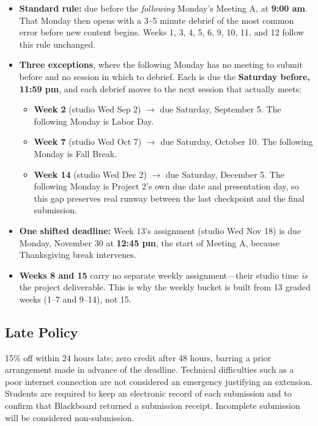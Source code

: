 \documentclass[11pt]{article}
\begin{document}
\begin{itemize}
  \item \textbf{Standard rule:} due before the \emph{following} Monday's Meeting A, at
        \textbf{9:00 am}. That Monday then opens with a 3--5 minute debrief of the most common
        error before new content begins. Weeks 1, 3, 4, 5, 6, 9, 10, 11, and 12 follow this
        rule unchanged.
  \item \textbf{Three exceptions}, where the following Monday has no meeting to submit before
        and no session in which to debrief. Each is due the \textbf{Saturday before, 11:59
        pm}, and each debrief moves to the next session that actually meets:
        \begin{itemize}
          \item \textbf{Week 2} (studio Wed Sep 2) $\rightarrow$ due Saturday, September 5.
                The following Monday is Labor Day.
          \item \textbf{Week 7} (studio Wed Oct 7) $\rightarrow$ due Saturday, October 10.
                The following Monday is Fall Break.
          \item \textbf{Week 14} (studio Wed Dec 2) $\rightarrow$ due Saturday, December 5.
                The following Monday is Project 2's own due date and presentation day, so this
                gap preserves real runway between the last checkpoint and the final
                submission.
        \end{itemize}
  \item \textbf{One shifted deadline:} Week 13's assignment (studio Wed Nov 18) is due Monday,
        November 30 at \textbf{12:45 pm}, the start of Meeting A, because Thanksgiving break
        intervenes.
  \item \textbf{Weeks 8 and 15} carry no separate weekly assignment---their studio time
        \emph{is} the project deliverable. This is why the weekly bucket is built from 13
        graded weeks (1--7 and 9--14), not 15.
\end{itemize}

\subsection{Late Policy}

15\% off within 24 hours late; zero credit after 48 hours, barring a prior arrangement made in
advance of the deadline. Technical difficulties such as a poor internet connection are not
considered an emergency justifying an extension. Students are required to keep an electronic
record of each submission and to confirm that Blackboard returned a submission receipt.
Incomplete submission will be considered non-submission.
\end{document}
